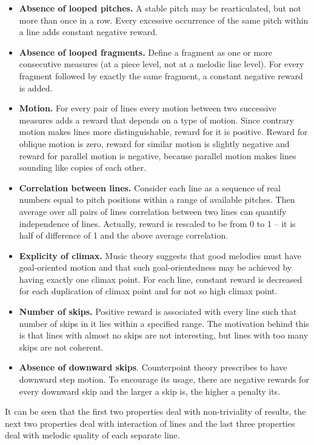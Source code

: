 \documentclass{article}
\begin{document}
\begin{itemize}
	\item \textbf{Absence of looped pitches.} A stable pitch may be rearticulated, but not more than once in a row. Every excessive occurrence of the same pitch within a line adds constant negative reward.
    \item \textbf{Absence of looped fragments.} Define a fragment as one or more consecutive measures (at a piece level, not at a melodic line level). For every fragment followed by exactly the same fragment, a constant negative reward is added.
	\item \textbf{Motion.} For every pair of lines every motion between two successive measures adds a reward that depends on a type of motion. Since contrary motion makes lines more distinguishable, reward for it is positive. Reward for oblique motion is zero, reward for similar motion is slightly negative and reward for parallel motion is negative, because parallel motion makes lines sounding like copies of each other.
	\item \textbf{Correlation between lines.} Consider each line as a sequence of real numbers equal to pitch positions within a range of available pitches. Then average over all pairs of lines correlation between two lines can quantify independence of lines. Actually, reward is rescaled to be from 0 to 1 -- it is half of difference of 1 and the above average correlation.
    \item \textbf{Explicity of climax.} Music theory suggests that good melodies must have goal-oriented motion and that such goal-orientedness may be achieved by having exactly one climax point. For each line, constant reward is decreased for each duplication of climax point and for not so high climax point.
    \item \textbf{Number of skips.} Positive reward is associated with every line such that number of skips in it lies within a specified range. The motivation behind this is that lines with almost no skips are not interesting, but lines with too many skips are not coherent.
    \item \textbf{Absence of downward skips}. Counterpoint theory prescribes to have downward step motion. To encourage its usage, there are negative rewards for every downward skip and the larger a skip is, the higher a penalty its.
\end{itemize}

It can be seen that the first two properties deal with non-triviality of results, the next two properties deal with interaction of lines and the last three properties deal with melodic quality of each separate line. 
\end{document}
